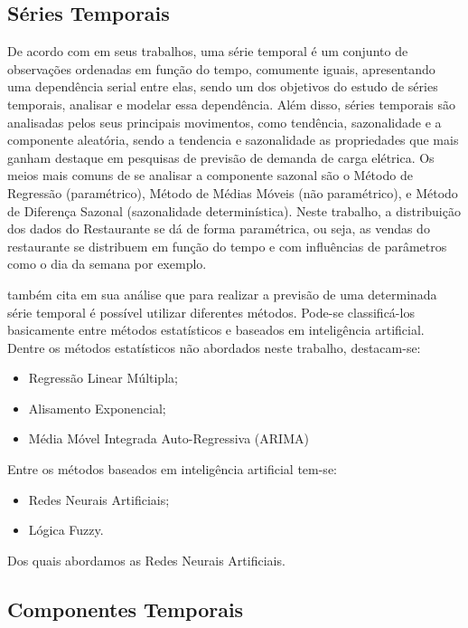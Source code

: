 \documentclass[	12pt, Times, openright, twoside, a4paper, english, brazil]{abntex2}
\begin{document}
        \subsection{Séries Temporais}
          De acordo com  \cite{Morettin1987} em seus trabalhos, uma série temporal é um conjunto de observações ordenadas em função do tempo, comumente iguais, apresentando uma dependência serial entre elas, sendo um dos objetivos do estudo de séries temporais, analisar e modelar essa dependência. Além disso, séries temporais são analisadas pelos seus principais movimentos, como tendência, sazonalidade e a componente aleatória, sendo a tendencia e sazonalidade as propriedades que mais ganham destaque em pesquisas de previsão de demanda de carga elétrica. Os meios mais comuns de se analisar a componente sazonal são o Método de Regressão (paramétrico), Método de Médias Móveis (não paramétrico), e Método de Diferença Sazonal (sazonalidade determinística).  Neste trabalho, a distribuição dos dados do Restaurante se dá de forma paramétrica, ou seja, as vendas do restaurante se distribuem em função do tempo e com influências de parâmetros como o dia da semana por exemplo. 

          \cite{Almeida2013} também cita  em sua análise que para realizar a previsão de uma determinada série temporal é possível utilizar diferentes métodos. Pode-se classificá-los basicamente entre métodos estatísticos e baseados em inteligência artificial.
          Dentre os métodos estatísticos não abordados neste trabalho, destacam-se:
          \begin{itemize}
              \item Regressão Linear Múltipla;
              \item Alisamento Exponencial;
              \item Média Móvel Integrada Auto-Regressiva (ARIMA)
          \end{itemize}
          Entre os métodos baseados em inteligência artificial tem-se:
          \begin{itemize}
              \item Redes Neurais Artificiais;
              \item Lógica Fuzzy.
          \end{itemize}
          Dos quais abordamos as Redes Neurais Artificiais.

        \subsection{Componentes Temporais}
\end{document}

